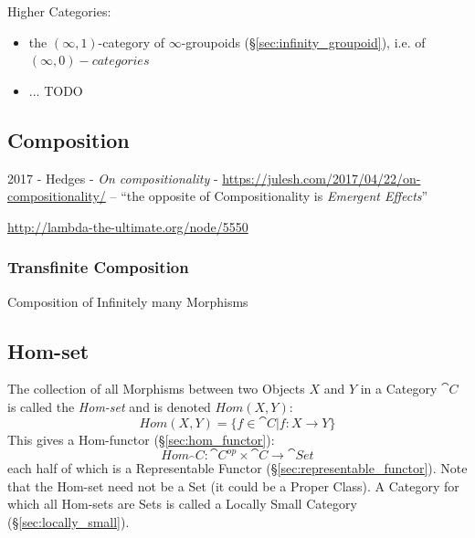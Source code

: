 Higher Categories:


\begin{itemize}
\item [$\infty$Grpd] the $(\infty,1)$-category of $\infty$-groupoids
  (\S\ref{sec:infinity_groupoid}), i.e. of $(\infty,0)-categories$
\item ... TODO
\end{itemize}



\subsection{Composition}\label{sec:composition}

2017 - Hedges - \emph{On compositionality} -
\url{https://julesh.com/2017/04/22/on-compositionality/} -- ``the opposite of
Compositionality is \emph{Emergent Effects}''

\url{http://lambda-the-ultimate.org/node/5550}



\subsubsection{Transfinite Composition}
\label{sec:transfinite_composition}

Composition of Infinitely many Morphisms



\subsection{Hom-set}\label{sec:hom_set}

The collection of all Morphisms between two Objects $X$ and $Y$ in a
Category $\cat{C}$ is called the \emph{Hom-set} and is denoted
$Hom(X,Y)$:
\[
  Hom(X,Y) = \{f \in \cat{C} | f : X \rightarrow Y\}
\]
This gives a Hom-functor (\S\ref{sec:hom_functor}):
\[
  Hom_\cat{C} : \cat{C^{op}} \times \cat{C} \rightarrow \cat{Set}
\]
each half of which is a Representable Functor
(\S\ref{sec:representable_functor}).
\newline
\fist Note that the Hom-set need not be a Set (it could be a
Proper Class). A Category for which all Hom-sets are Sets is called a
Locally Small Category (\S\ref{sec:locally_small}).

